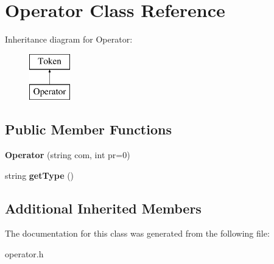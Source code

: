 \hypertarget{classOperator}{\section{Operator Class Reference}
\label{classOperator}
}
Inheritance diagram for Operator\-:\begin{figure}[H]
\begin{center}
\leavevmode
\includegraphics[height=2.000000cm]{classOperator}
\end{center}
\end{figure}
\subsection*{Public Member Functions}
\begin{DoxyCompactItemize}
\item 
\hypertarget{classOperator_a9997ab589491e1f9f6a16acebb684f32}{{\bfseries Operator} (string com, int pr=0)}\label{classOperator_a9997ab589491e1f9f6a16acebb684f32}

\item 
\hypertarget{classOperator_a53fad716ad508398daeedbbdb83ab56c}{string {\bfseries get\-Type} ()}\label{classOperator_a53fad716ad508398daeedbbdb83ab56c}

\end{DoxyCompactItemize}
\subsection*{Additional Inherited Members}


The documentation for this class was generated from the following file\-:\begin{DoxyCompactItemize}
\item 
operator.\-h\end{DoxyCompactItemize}

